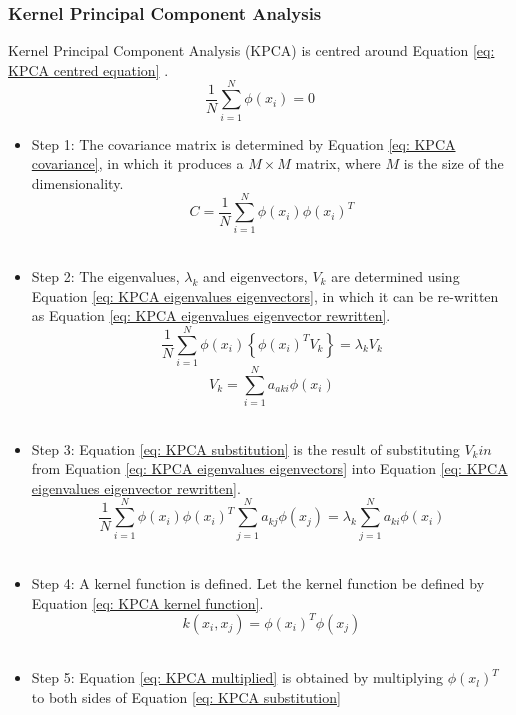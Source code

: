 \documentclass[11pt,twocolumn]{witseiepaper}
\begin{document}
	\subsubsection{Kernel Principal Component Analysis}
	Kernel Principal Component Analysis (KPCA) is centred around Equation \ref{eq: KPCA centred equation} \cite{Ibrahim_Baharudin2016}.
	\begin{equation}
		\label{eq: KPCA centred equation}
		\frac{1}{N}\sum_{i=1}^{N}\phi(x_i)=0
	\end{equation}
	\begin{itemize}
		\item Step 1: The covariance matrix is determined by Equation \ref{eq: KPCA covariance}, in which it produces a $M \times M$ matrix, where $M$ is the size of the dimensionality.
		\begin{equation}
			\label{eq: KPCA covariance}
			C = \frac{1}{N}\sum_{i=1}^{N}\phi(x_i)\phi(x_i)^T
		\end{equation} \\
		\item Step 2: The eigenvalues, $\lambda_k$ and eigenvectors, $V_k$ are determined using Equation \ref{eq: KPCA eigenvalues eigenvectors}, in which it can be re-written as Equation \ref{eq: KPCA eigenvalues eigenvector rewritten}.
		\begin{equation}
			\label{eq: KPCA eigenvalues eigenvectors}
			\frac{1}{N}\sum_{i=1}^{N}\phi(x_i)\left\{\phi(x_i)^TV_k\right\} = \lambda_k V_k
		\end{equation} 
		\begin{equation}
			\label{eq: KPCA eigenvalues eigenvector rewritten}
			V_k = \sum_{i=1}^{N}a_{aki}\phi(x_i)
		\end{equation} \\
		\item Step 3: Equation \ref{eq: KPCA substitution} is the result of substituting $V_kin$ from Equation \ref{eq: KPCA eigenvalues eigenvectors} into Equation \ref{eq: KPCA eigenvalues eigenvector rewritten}.
		\begin{equation}
			\label{eq: KPCA substitution}
			\frac{1}{N}\sum_{i=1}^{N}\phi(x_i)\phi(x_i)^T \sum_{j=1}^{N}a_{kj}\phi(x_j) = \lambda_{k}\sum_{j=1}^{N}a_{ki}\phi(x_i)
		\end{equation} \\
		\item Step 4: A kernel function is defined. Let the kernel function be defined by Equation \ref{eq: KPCA kernel function}.
		\begin{equation}
			\label{eq: KPCA kernel function}
			k(x_i, x_j) = \phi(x_i)^T\phi(x_j)
		\end{equation}\\
		\item Step 5: Equation \ref{eq: KPCA multiplied} is obtained by multiplying $\phi(x_l)^T$ to both sides of Equation \ref{eq: KPCA substitution}
	\end{itemize}
\end{document}
